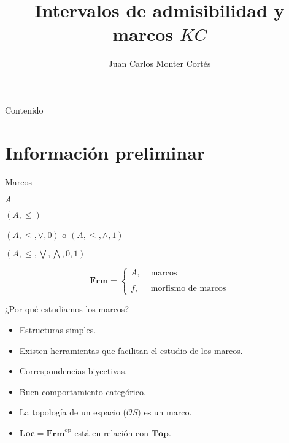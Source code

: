 \documentclass[compress,12pt]{beamer}
\title{Intervalos de admisibilidad y marcos $KC$}
\author{Juan Carlos Monter Cortés}
\institute{Universidad de Guadalajara}
\DeclareMathOperator{\op}{op}
\begin{document}
\frame[plain]{\titlepage}

\begin{frame}{Contenido}
\tableofcontents %
\end{frame}

\section{Información preliminar}
\begin{frame}{Marcos}
    \begin{itemize}
        \begin{multicols}{2}
            \item $A$
            \item $(A, \leq)$
            \item $(A, \leq, \vee, 0)$ o $(A, \leq, \wedge, 1)$
            \item $(A, \leq, \bigvee, \bigwedge, 0, 1)$
        \end{multicols} 
        \end{itemize}
    
    
        \[
        \mathbf{Frm}=\left\{ \begin{array}{ll} A, & \mbox{ marcos}\\ \\  f, & \mbox{ morfismo de marcos} \end{array} \right.
        \]
\end{frame}

\begin{frame}{¿Por qué estudiamos los marcos?}
    \begin{itemize}
        \item Estructuras simples.
        \item<2-> Existen herramientas que facilitan el estudio de los marcos.
        \item<3-> Correspondencias biyectivas.
        \item<4-> Buen comportamiento categórico.
        \item<5-> \alert<7->{La topología de un espacio ($\mathcal{O}S)$ es un marco.}
        \item<6-> $\mathbf{Loc}=\mathbf{Frm}^{\op}$ está en relación con $\mathbf{Top}$.
    \end{itemize}
\end{frame}
\end{document}
